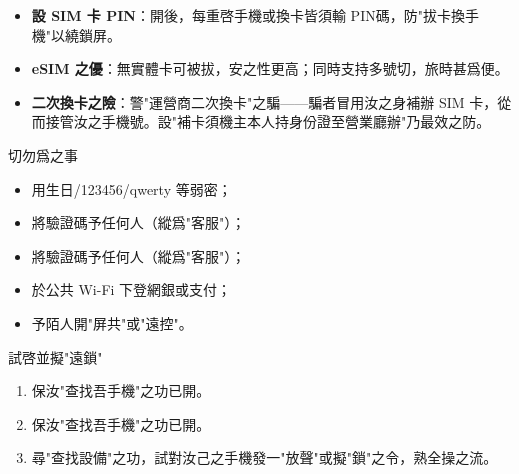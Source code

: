 \begin{itemize}
  \item \textbf{設 SIM 卡 PIN}：開後，每重啓手機或換卡皆須輸 PIN碼，防"拔卡換手機"以繞鎖屏。
  \item \textbf{eSIM 之優}：無實體卡可被拔，安之性更高；同時支持多號切，旅時甚爲便。
  \item \textbf{二次換卡之險}：警"運營商二次換卡"之騙——騙者冒用汝之身補辦 SIM 卡，從而接管汝之手機號。設"補卡須機主本人持身份證至營業廳辦"乃最效之防。
\end{itemize}

\begin{tcbwarn}{切勿爲之事}
\begin{itemize}
  \item 用生日/123456/qwerty 等弱密；
  \item 將驗證碼予任何人（縱爲"客服"）；
  \item 將驗證碼予任何人（縱爲"客服"）；
  \item 於公共 Wi-Fi 下登網銀或支付；
  \item 予陌人開"屏共"或"遠控"。
\end{itemize}

\end{tcbwarn}

\begin{tcbpractice}{試啓並擬"遠鎖"}
\begin{enumerate}
  \item 保汝"查找吾手機"之功已開。
  \item 保汝"查找吾手機"之功已開。
  \item 尋"查找設備"之功，試對汝己之手機發一"放聲"或擬"鎖"之令，熟全操之流。
\end{enumerate}

\end{tcbpractice}
